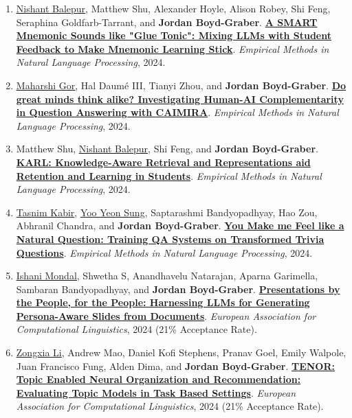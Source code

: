 {\begin{enumerate}
	 \item \underline{\href{https://nbalepur.github.io/}{Nishant Balepur}}, Matthew Shu, Alexander Hoyle, Alison Robey, Shi Feng, Seraphina Goldfarb-Tarrant, and {\bf Jordan Boyd-Graber}.  {\bf \href{http://cs.umd.edu/~jbg//docs/2024_emnlp_mnemonic.pdf}{A SMART Mnemonic Sounds like "Glue Tonic": Mixing LLMs with Student Feedback to Make Mnemonic Learning Stick}}.  \emph{Empirical Methods in Natural Language Processing}, 2024.

	 \item \underline{\href{https://mgor.info/}{Maharshi Gor}}, Hal {Daum\'{e} III}, Tianyi Zhou, and {\bf Jordan Boyd-Graber}.  {\bf \href{http://cs.umd.edu/~jbg//docs/2024_emnlp_caimira.pdf}{Do great minds think alike? Investigating Human-AI Complementarity in Question Answering with CAIMIRA}}.  \emph{Empirical Methods in Natural Language Processing}, 2024.

	 \item Matthew Shu, \underline{\href{https://nbalepur.github.io/}{Nishant Balepur}}, Shi Feng, and {\bf Jordan Boyd-Graber}.  {\bf \href{http://cs.umd.edu/~jbg//docs/2024_emnlp_karl.pdf}{KARL: Knowledge-Aware Retrieval and Representations aid Retention and Learning in Students}}.  \emph{Empirical Methods in Natural Language Processing}, 2024.

	 \item \underline{Tasnim Kabir}, \underline{\href{http://yysung.github.io/}{Yoo Yeon Sung}}, Saptarashmi Bandyopadhyay, Hao Zou, Abhranil Chandra, and {\bf Jordan Boyd-Graber}.  {\bf \href{http://cs.umd.edu/~jbg//docs/2024_emnlp_natural.pdf}{You Make me Feel like a Natural Question: Training QA Systems on Transformed Trivia Questions}}.  \emph{Empirical Methods in Natural Language Processing}, 2024.

	 \item \underline{\href{https://ishani-mondal.github.io/}{Ishani Mondal}}, Shwetha S, Anandhavelu Natarajan, Aparna Garimella, Sambaran Bandyopadhyay, and {\bf Jordan Boyd-Graber}.  {\bf \href{http://cs.umd.edu/~jbg//docs/2024_eacl_slides.pdf}{Presentations by the People, for the People: Harnessing LLMs for Generating Persona-Aware Slides from Documents}}.  \emph{European Association for Computational Linguistics}, 2024 (21\% Acceptance Rate).

	 \item \underline{\href{https://zli12321.github.io/}{Zongxia Li}}, Andrew Mao, Daniel Kofi Stephens, Pranav Goel, Emily Walpole, Juan Francisco Fung, Alden Dima, and {\bf Jordan Boyd-Graber}.  {\bf \href{http://cs.umd.edu/~jbg//docs/2024_eacl_tenor.pdf}{TENOR: Topic Enabled Neural Organization and Recommendation: Evaluating Topic Models in Task Based Settings}}.  \emph{European Association for Computational Linguistics}, 2024 (21\% Acceptance Rate).


\end{enumerate}}
